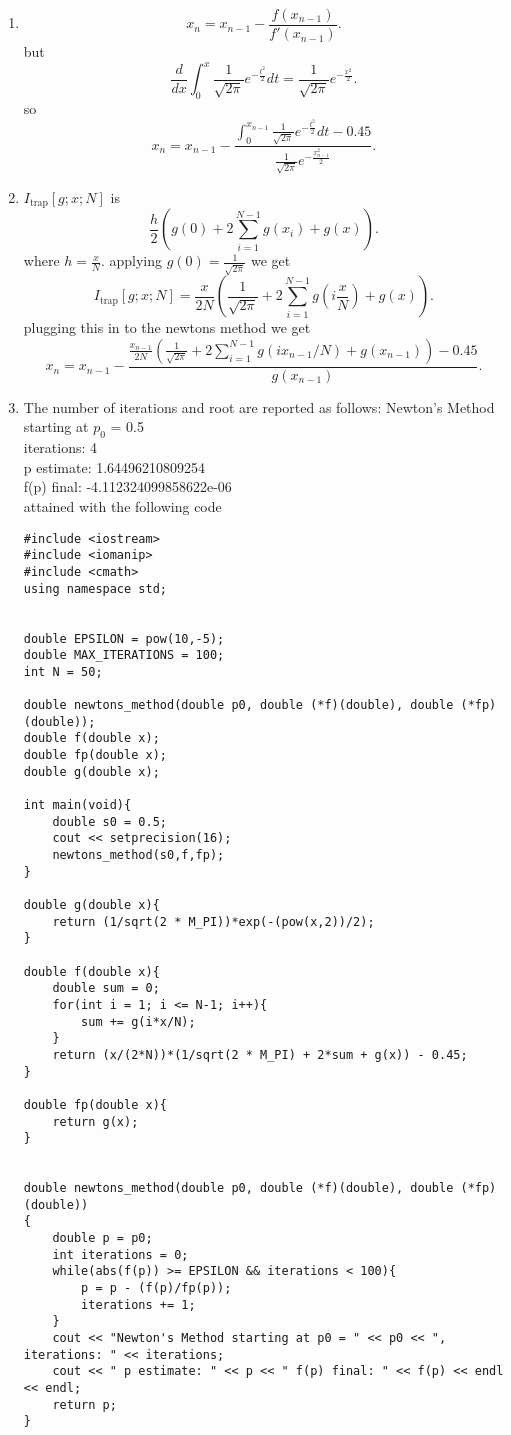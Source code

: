 \documentclass{amsart}
\begin{document}
    \begin{enumerate}[label = (\alph*)]
        \item 
            \[
                 x_n = x_{n-1} - \frac{f(x_{n-1})}{f'(x_{n-1})}
            .\] 
            but 
            \[
            \frac{d}{dx}\int_{0}^{x}\frac{1}{\sqrt{2\pi }}e^{-\frac{t^2}{2}}dt =\frac{1}{\sqrt{2\pi} }e^{-\frac{x^2}{2}}
            .\] 
            so
            \[
                x_n = x_{n-1} - \frac{\int_{0}^{x_{n-1}}\frac{1}{\sqrt{2\pi} }e^{-\frac{t^2}{2}}dt - 0.45}{\frac{1}{\sqrt{2\pi }}e^{-\frac{x_{n-1}^2}{2}}}
            .\] 
        \item $I_{\text{trap}}[g;x;N]$ is
            \[
            \frac{h}{2}(g(0) + 2\sum_{i=1}^{N-1}g(x_i) + g(x))
            .\] 
            where $h = \frac{x}{N}$. applying $g(0) = \frac{1}{\sqrt{2\pi}}$ we get
            \[
                I_{\text{trap}}[g;x;N] = \frac{x}{2N}(\frac{1}{\sqrt{2\pi}}+2\sum_{i=1}^{N-1}g(i\frac{x}{N}) + g(x))
            .\] 
            plugging this in to the newtons method we get
            \[
                x_n = x_{n-1} - \frac{\frac{x_{n-1}}{2N}(\frac{1}{\sqrt{2\pi}} + 2\sum_{i=1}^{N-1}g(ix_{n-1}/N) + g(x_{n-1}))-0.45}{g(x_{n-1})}
            .\] 
        \item The number of iterations and root are reported as follows:
            Newton's Method starting at $p_0$ = 0.5\\
            iterations: 4\\
            p estimate: 1.64496210809254\\
            f(p) final: -4.112324099858622e-06
            \\
            attained with the following code
            \begin{lstlisting}
#include <iostream>
#include <iomanip>
#include <cmath>
using namespace std;


double EPSILON = pow(10,-5);
double MAX_ITERATIONS = 100;
int N = 50;

double newtons_method(double p0, double (*f)(double), double (*fp)(double));
double f(double x);
double fp(double x);
double g(double x);

int main(void){
    double s0 = 0.5;
    cout << setprecision(16);
    newtons_method(s0,f,fp);
}

double g(double x){
    return (1/sqrt(2 * M_PI))*exp(-(pow(x,2))/2);
}

double f(double x){
    double sum = 0;
    for(int i = 1; i <= N-1; i++){
        sum += g(i*x/N);
    }
    return (x/(2*N))*(1/sqrt(2 * M_PI) + 2*sum + g(x)) - 0.45;
}

double fp(double x){
    return g(x);
}


double newtons_method(double p0, double (*f)(double), double (*fp)(double))
{
    double p = p0;
    int iterations = 0;
    while(abs(f(p)) >= EPSILON && iterations < 100){
        p = p - (f(p)/fp(p));
        iterations += 1;
    }
    cout << "Newton's Method starting at p0 = " << p0 << ", iterations: " << iterations;
    cout << " p estimate: " << p << " f(p) final: " << f(p) << endl << endl;
    return p;
}
            \end{lstlisting}
    \end{enumerate}
\end{document}
